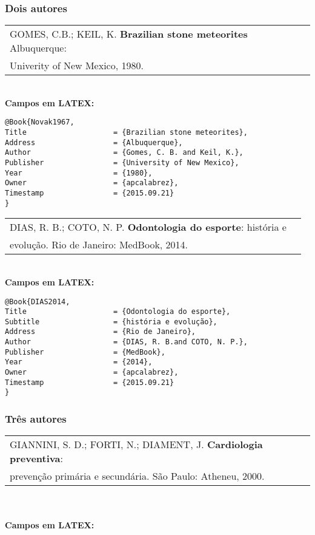 \subsubsection{Dois autores}

\begin{tabular}{|l|c|} \hline
GOMES, C.B.; KEIL, K. \textbf{Brazilian stone meteorites} Albuquerque: \\ Univerity of New Mexico, 1980. \\\hline
\end{tabular}\\

\textbf{Campos em LATEX:}
\begin{verbatim}
@Book{Novak1967,
Title                    = {Brazilian stone meteorites},
Address                  = {Albuquerque},
Author                   = {Gomes, C. B. and Keil, K.},
Publisher                = {University of New Mexico},
Year                     = {1980},
Owner                    = {apcalabrez},
Timestamp                = {2015.09.21}
}
\end{verbatim}

\begin{tabular}{|l|c|} \hline
DIAS, R. B.; COTO, N. P. \textbf{Odontologia do esporte}: história e \\ evolução. Rio de Janeiro: MedBook, 2014. \\\hline
\end{tabular}\\

\textbf{Campos em LATEX:}

\begin{verbatim}
@Book{DIAS2014,
Title                    = {Odontologia do esporte},
Subtitle                 = {história e evolução},
Address                  = {Rio de Janeiro},
Author                   = {DIAS, R. B.and COTO, N. P.},
Publisher                = {MedBook},
Year                     = {2014},
Owner                    = {apcalabrez},
Timestamp                = {2015.09.21}
}
\end{verbatim}

\subsubsection{Três autores}

\begin{tabular}{|l|c|} \hline
GIANNINI, S. D.; FORTI, N.; DIAMENT, J. \textbf{Cardiologia preventiva}:\\ prevenção primária e secundária. São Paulo: Atheneu, 2000. \\\hline
\end{tabular}\\
\\
\textbf{Campos em LATEX:}

